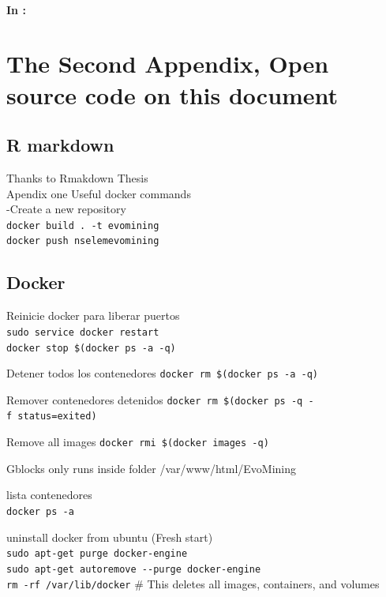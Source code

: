 \documentclass[12pt,twoside]{reedthesis}
\begin{document}
  \subsubsection{\texorpdfstring{In
  \protect\hyperlink{refux5flabels}{}:}{In :}}\label{in}
  
  \chapter{The Second Appendix, Open source code on this
  document}\label{the-second-appendix-open-source-code-on-this-document}
  
  \section{R markdown}\label{r-markdown}
  
  Thanks to Rmakdown Thesis\\
  Apendix one Useful docker commands\\
  -Create a new repository\\
  \texttt{docker\ build\ .\ -t\ evomining}\\
  \texttt{docker\ push\ nselemevomining}
  
  \section{Docker}\label{docker}
  
  Reinicie docker para liberar puertos\\
  \texttt{sudo\ service\ docker\ restart}\\
  \texttt{docker\ stop\ \$(docker\ ps\ -a\ -q)}
  
  Detener todos los contenedores
  \texttt{docker\ rm\ \$(docker\ ps\ -a\ -q)}
  
  Remover contenedores detenidos
  \texttt{docker\ rm\ \$(docker\ ps\ -q\ -f\ status=exited)}
  
  Remove all images \texttt{docker\ rmi\ \$(docker\ images\ -q)}
  
  Gblocks only runs inside folder /var/www/html/EvoMining
  
  lista contenedores\\
  \texttt{docker\ ps\ -a}
  
  uninstall docker from ubuntu (Fresh start)\\
  \texttt{sudo\ apt-get\ purge\ docker-engine}\\
  \texttt{sudo\ apt-get\ autoremove\ -\/-purge\ docker-engine}\\
  \texttt{rm\ -rf\ /var/lib/docker} \# This deletes all images,
  containers, and volumes
  
\end{document}
